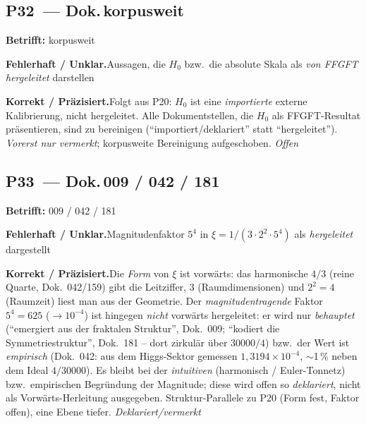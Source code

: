 \medskip


\subsection*{P32~--- Dok.\,korpusweit}

\noindent\textbf{Betrifft:} korpusweit


\smallskip\noindent\textbf{Fehlerhaft / Unklar.}\quad Aussagen, die $H_0$ bzw.\ die absolute Skala als \emph{von FFGFT hergeleitet} darstellen


\smallskip\noindent\textbf{Korrekt / Präzisiert.}\quad Folgt aus P20: $H_0$ ist eine \emph{importierte} externe Kalibrierung, nicht hergeleitet. Alle Dokumentstellen, die $H_0$ als FFGFT-Resultat präsentieren, sind zu bereinigen (\enquote{importiert/deklariert} statt \enquote{hergeleitet}). \emph{Vorerst nur vermerkt}; korpusweite Bereinigung aufgeschoben. \emph{Offen}


\medskip


\subsection*{P33~--- Dok.\,009 / 042 / 181}

\noindent\textbf{Betrifft:} 009 / 042 / 181


\smallskip\noindent\textbf{Fehlerhaft / Unklar.}\quad Magnitudenfaktor $5^4$ in $\xi = 1/(3\cdot2^2\cdot5^4)$ als \emph{hergeleitet} dargestellt


\smallskip\noindent\textbf{Korrekt / Präzisiert.}\quad Die \emph{Form} von $\xi$ ist vorwärts: das harmonische $4/3$ (reine Quarte, Dok.~042/159) gibt die Leitziffer, $3$ (Raumdimensionen) und $2^2{=}4$ (Raumzeit) liest man aus der Geometrie. Der \emph{magnitudentragende} Faktor $5^4{=}625$ ($\to 10^{-4}$) ist hingegen \emph{nicht} vorwärts hergeleitet: er wird nur \emph{behauptet} (\enquote{emergiert aus der fraktalen Struktur}, Dok.~009; \enquote{kodiert die Symmetriestruktur}, Dok.~181 -- dort zirkulär über $30000/4$) bzw.\ der Wert ist \emph{empirisch} (Dok.~042: aus dem Higgs-Sektor gemessen $1{,}3194\times10^{-4}$, $\sim$1\,\% neben dem Ideal $4/30000$). Es bleibt bei der \emph{intuitiven} (harmonisch / Euler-Tonnetz) bzw.\ empirischen Begründung der Magnitude; diese wird offen so \emph{deklariert}, nicht als Vorwärts-Herleitung ausgegeben. Struktur-Parallele zu P20 (Form fest, Faktor offen), eine Ebene tiefer. \emph{Deklariert/vermerkt}


